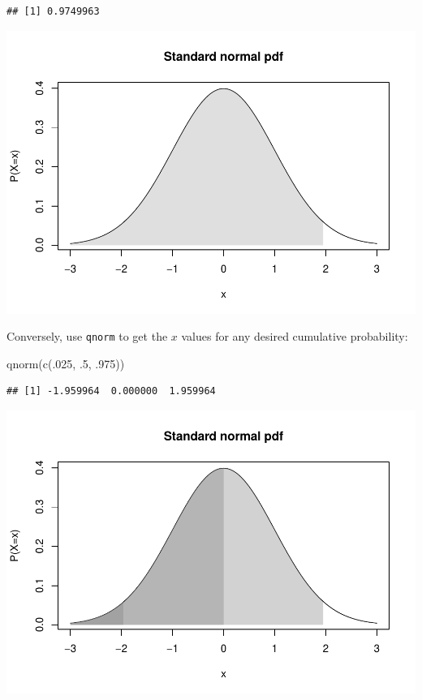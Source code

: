 \documentclass[
  11pt,
]{article}
\newenvironment{Shaded}{\begin{snugshade}}{\end{snugshade}}
\newcommand{\DecValTok}[1]{\textcolor[rgb]{0.00,0.00,0.81}{#1}}
\newcommand{\FunctionTok}[1]{\textcolor[rgb]{0.00,0.00,0.00}{#1}}
\newcommand{\NormalTok}[1]{#1}
\begin{document}
\begin{verbatim}
## [1] 0.9749963
\end{verbatim}

\begin{center}\includegraphics{01-lec-short_files/figure-latex/stdnorm-5-1} \end{center}

Conversely, use \texttt{qnorm} to get the \(x\) values for any desired cumulative probability:

\begin{Shaded}
\begin{Highlighting}[]
\FunctionTok{qnorm}\NormalTok{(}\FunctionTok{c}\NormalTok{(.}\DecValTok{025}\NormalTok{, .}\DecValTok{5}\NormalTok{, .}\DecValTok{975}\NormalTok{))}
\end{Highlighting}
\end{Shaded}

\begin{verbatim}
## [1] -1.959964  0.000000  1.959964
\end{verbatim}

\begin{center}\includegraphics{01-lec-short_files/figure-latex/stdnorm-7-1} \end{center}
\end{document}
